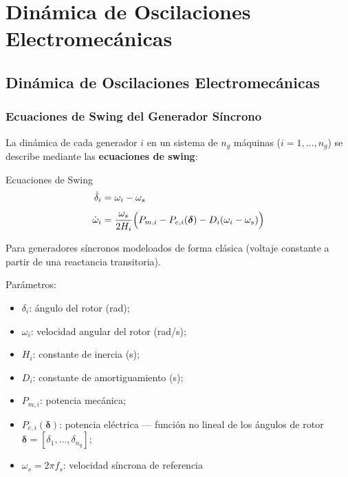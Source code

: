 \section{Dinámica de Oscilaciones Electromecánicas}

\subsection{Dinámica de Oscilaciones Electromecánicas}
\subsubsection{Ecuaciones de Swing del Generador Síncrono}

La dinámica de cada generador $i$ en un sistema de $n_g$ máquinas ($i=1,\ldots,n_g$) se describe mediante las \textbf{ecuaciones de swing}:

\begin{block}{Ecuaciones de Swing }
\begin{align}
    \dot{\delta}_i  &= \omega_i - \omega_s \label{eq:swing1} \\[4pt]
    \dot{\omega}_i  &= \frac{\omega_s}{2H_i}
                       \Bigl(P_{m,i} - P_{e,i}(\boldsymbol{\delta}) - D_i(\omega_i - \omega_s)\Bigr)
                       \label{eq:swing2}
\end{align}
\end{block}

Para generadores síncronos modeloados de forma clásica (voltaje constante a partir de una reactancia transitoria). 


Parámetros: 

\begin{itemize}
    \item $\delta_i$: ángulo del rotor (rad);
    \item $\omega_i$: velocidad angular del rotor (rad/s);
    \item $H_i$: constante de inercia (s); 
    \item $D_i$: constante de amortiguamiento (s);
    \item $P_{m,i}$: potencia mecánica; 
    \item $P_{e,i}(\boldsymbol{\delta})$: potencia eléctrica — función no lineal de los ángulos de rotor $\boldsymbol{\delta} = [\delta_1, \ldots, \delta_{n_g}]$;
    \item $\omega_s = 2\pi f_s$: velocidad síncrona de referencia
\end{itemize}

